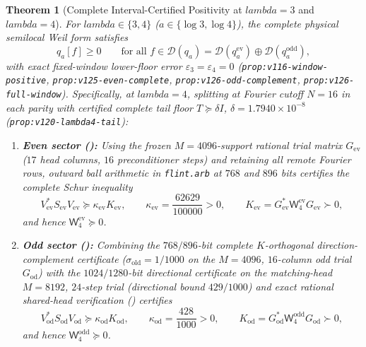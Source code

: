 \documentclass[11pt]{article}
\def\lambda{lambda}%
\newtheorem{theorem}{Theorem}[section]
\theoremstyle{remark}
\begin{document}
\begin{theorem}[Complete Interval-Certified Positivity at $\lambda = 3$ and $\lambda = 4$]
\label{thm:lambda4-positivity}
For $\lambda \in \{3, 4\}$ ($a \in \{\log 3, \log 4\}$), the complete physical semilocal Weil form satisfies
\begin{equation}
  q_a[f] \ge 0 \qquad \text{for all } f \in \mathcal{D}(q_a) = \mathcal{D}(q_a^{\mathrm{ev}}) \oplus \mathcal{D}(q_a^{\mathrm{odd}}),
\end{equation}
with exact fixed-window lower-floor error $\varepsilon_3 = \varepsilon_4 = 0$ (\texttt{prop:v116-window-positive}, \texttt{prop:v125-even-complete}, \texttt{prop:v126-odd-complement}, \texttt{prop:v126-full-window}). Specifically, at $\lambda = 4$, splitting at Fourier cutoff $N = 16$ in each parity with certified complete tail floor $T \succeq \delta I$, $\delta = 1.7940 \times 10^{-8}$ (\texttt{prop:v120-lambda4-tail}):
\begin{enumerate}[label=(\alph*)]
  \item \textbf{Even sector ():} Using the frozen $M = 4096$-support rational trial matrix $G_{\mathrm{ev}}$ ($17$ head columns, $16$ preconditioner steps) and retaining all remote Fourier rows, outward ball arithmetic in \texttt{flint.arb} at $768$ and $896$ bits certifies the complete Schur inequality
  \[
    V_{\mathrm{ev}}^* S_{\mathrm{ev}} V_{\mathrm{ev}} \succeq \kappa_{\mathrm{ev}} K_{\mathrm{ev}}, \qquad \kappa_{\mathrm{ev}} = \frac{62629}{100000} > 0, \qquad K_{\mathrm{ev}} = G_{\mathrm{ev}}^*\mathsf{W}_4^{\mathrm{ev}} G_{\mathrm{ev}} \succ 0,
  \]
  and hence $\mathsf{W}_4^{\mathrm{ev}} \succeq 0$.
  \item \textbf{Odd sector ():} Combining the $768/896$-bit complete $K$-orthogonal direction-complement certificate ($\sigma_{\mathrm{old}} = 1/1000$ on the $M = 4096$, $16$-column odd trial $G_{\mathrm{od}}$) with the $1024/1280$-bit directional certificate on the matching-head $M = 8192$, $24$-step trial (directional bound $429/1000$) and exact rational shared-head verification () certifies
  \[
    V_{\mathrm{od}}^* S_{\mathrm{od}} V_{\mathrm{od}} \succeq \kappa_{\mathrm{od}} K_{\mathrm{od}}, \qquad \kappa_{\mathrm{od}} = \frac{428}{1000} > 0, \qquad K_{\mathrm{od}} = G_{\mathrm{od}}^*\mathsf{W}_4^{\mathrm{odd}} G_{\mathrm{od}} \succ 0,
  \]
  and hence $\mathsf{W}_4^{\mathrm{odd}} \succeq 0$.
\end{enumerate}
\end{theorem}
\end{document}
